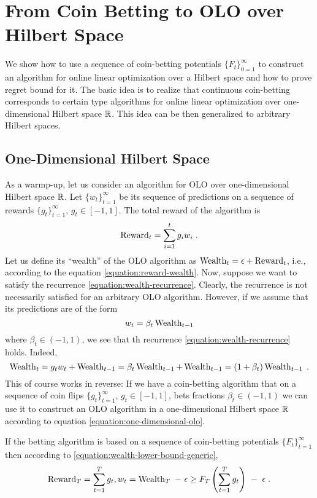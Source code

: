\section{From Coin Betting to OLO over Hilbert Space}

We show how to use a sequence of coin-betting potentials $\{F_t\}_{0=1}^\infty$
to construct an algorithm for online linear optimization over a Hilbert space
and how to prove regret bound for it. The basic idea is to realize that
continuous coin-betting corresponds to certain type algorithms
for online linear optimization over one-dimensional Hilbert space $\mathbb{R}$.
This idea can be then generalized to arbitrary Hilbert spaces.

\subsection{One-Dimensional Hilbert Space}

As a warmp-up, let us consider an algorithm for OLO over one-dimensional Hilbert
space $\mathbb{R}$. Let $\{w_t\}_{t=1}^\infty$ be its sequence of predictions on a
sequence of rewards $\{g_t\}_{t=1}^\infty$, $g_t \in [-1,1]$. The total reward
of the algorithm is
$$
\operatorname{Reward}_t = \sum_{i=1}^t g_i w_i \; .
$$
Let us define its ``wealth'' of the OLO algorithm as $\operatorname{Wealth}_t = \epsilon +
\operatorname{Reward}_t$, i.e., according to the equation \eqref{equation:reward-wealth}. Now,
suppose we want to satisfy the recurrence \eqref{equation:wealth-recurrence}.
Clearly, the recurrence is not necessarily satisfied for an arbitrary
OLO algorithm. However, if we assume that its predictions are of the form
\begin{equation}
\label{equation:one-dimensional-olo}
w_t = \beta_t \operatorname{Wealth}_{t-1}
\end{equation}
where $\beta_t \in (-1,1)$, we see that th recurrence
\eqref{equation:wealth-recurrence} holds. Indeed,
$$
\operatorname{Wealth}_t
= g_t w_t + \operatorname{Wealth}_{t-1}
= \beta_t \operatorname{Wealth}_{t-1} + \operatorname{Wealth}_{t-1}
= (1+\beta_t) \operatorname{Wealth}_{t-1} \; .
$$
This of course works in reverse: If we have a coin-betting algorithm that on a
sequence of coin flips $\{g_t\}_{t=1}^\infty$, $g_t \in [-1,1]$, bets fractions
$\beta_t \in (-1,1)$ we can use it to construct an OLO algorithm in a
one-dimensional Hilbert space $\mathbb{R}$ according to equation
\eqref{equation:one-dimensional-olo}.

If the betting algorithm is based on a sequence of coin-betting potentials
$\{F_t\}_{t=1}^\infty$ then according to \eqref{equation:wealth-lower-bound-generic},
\begin{equation}
\label{equation:one-dimensional-olo-reward-lower-bound}
\Reward_T
= \sum_{t=1}^T g_t, w_t
= \Wealth_T \ - \ \epsilon \ge F_T\left(\sum_{t=1}^T g_t \right) \ - \ \epsilon \; .
\end{equation}

